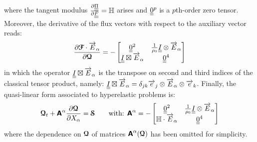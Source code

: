 where the tangent modulus $\drond{\tens{\Pi}}{\tens{F}}=\Hbb$ arises and $\tens{0}^p$ is a $p$th-order zero tensor. Moreover, the derivative of the flux vectors with respect to the auxiliary vector reads:
\begin{equation}
  \drond{\Fcb\cdot\vect{E}_\alpha}{\Qcb}=-\matrice{\tens{0}^2 & \frac{1}{\rho_0}\tens{I}\otimes\vect{E}_\alpha \\    \tens{I}\boxtimes \vect{E}_\alpha & \tens{0}^4}
\end{equation}
in which the operator $\tens{I}\boxtimes\vect{E}_\alpha$ is the transpose on second and third indices of the classical tensor product, namely: $\tens{I}\boxtimes\vect{E}_\alpha=\delta_{jk} \vect{e}_j\otimes \vect{E}_\alpha\otimes\vect{e}_k$.
Finally, the quasi-linear form associated to hyperelastic problems is:
\begin{equation}
  \Qcb_t + \Absf^\alpha \drond{\Qcb}{X_\alpha} = \Scb \qquad \text{with: }\Absf^\alpha = -\matrice{ \tens{0}^2 & \frac{1}{\rho_0}\tens{I}\otimes\vect{E}_\alpha \\ \Hbb\cdot\vect{E}_\alpha & \tens{0}^4} \label{eq:HE_quasilinear}
\end{equation}
where the dependence on $\Qcb$ of matrices $\Absf^\alpha(\Qcb)$ has been omitted for simplicity.

